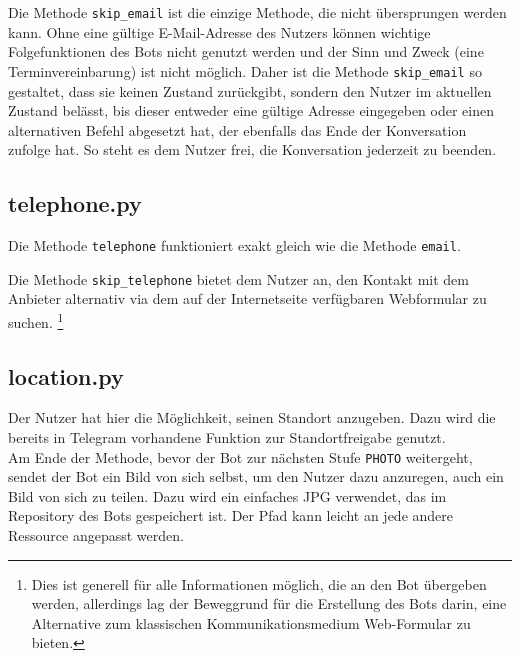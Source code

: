                 Die Methode \verb|skip_email| ist die einzige Methode, die nicht übersprungen werden kann. Ohne eine gültige E-Mail-Adresse des Nutzers können wichtige Folgefunktionen des Bots nicht genutzt werden und der Sinn und Zweck (eine Terminvereinbarung) ist nicht möglich. Daher ist die Methode \verb|skip_email| so gestaltet, dass sie keinen Zustand zurückgibt, sondern den Nutzer im aktuellen Zustand belässt, bis dieser entweder eine gültige Adresse eingegeben oder einen alternativen Befehl abgesetzt hat, der ebenfalls das Ende der Konversation zufolge hat. So steht es dem Nutzer frei, die Konversation jederzeit zu beenden. 
        
            
        \subsection{telephone.py} \label{Implementierung: telephone.py}
                Die Methode \verb|telephone| funktioniert exakt gleich wie die Methode \verb|email|.

                Die Methode \verb|skip_telephone| bietet dem Nutzer an, den Kontakt mit dem Anbieter alternativ via dem auf der Internetseite verfügbaren Webformular zu suchen. \footnote{Dies ist generell für alle Informationen möglich, die an den Bot übergeben werden, allerdings lag der Beweggrund für die Erstellung des Bots darin, eine Alternative zum klassischen Kommunikationsmedium Web-Formular zu bieten.}
        
        
        \subsection{location.py} \label{Implementierung: location.py}
                Der Nutzer hat hier die Möglichkeit, seinen Standort anzugeben. Dazu wird die bereits in Telegram vorhandene Funktion zur Standortfreigabe genutzt. \\
                Am Ende der Methode, bevor der Bot zur nächsten Stufe \verb|PHOTO| weitergeht, sendet der Bot ein Bild von sich selbst, um den Nutzer dazu anzuregen, auch ein Bild von sich zu teilen. Dazu wird ein einfaches JPG verwendet, das im Repository des Bots gespeichert ist. Der Pfad kann leicht an jede andere Ressource angepasst werden.


